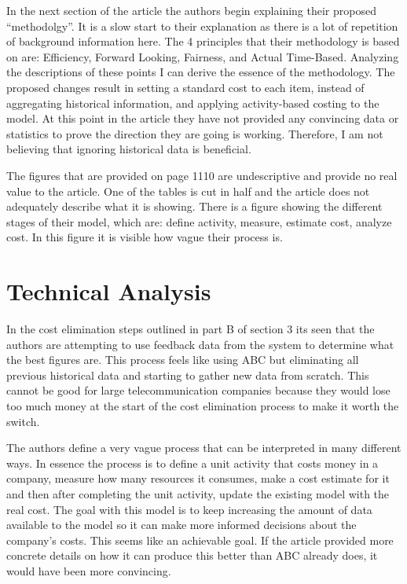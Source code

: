 \documentclass[10pt,]{article}
\begin{document}
In the next section of the article the authors begin explaining their
proposed ``methodolgy''. \citet{thearticle} It is a slow start to their
explanation as there is a lot of repetition of background information
here. The 4 principles that their methodology is based on are:
Efficiency, Forward Looking, Fairness, and Actual Time-Based. Analyzing
the descriptions of these points I can derive the essence of the
methodology. The proposed changes result in setting a standard cost to
each item, instead of aggregating historical information, and applying
activity-based costing to the model. At this point in the article they
have not provided any convincing data or statistics to prove the
direction they are going is working. Therefore, I am not believing that
ignoring historical data is beneficial.

The figures that are provided on page 1110 are undescriptive and provide
no real value to the article. One of the tables is cut in half and the
article does not adequately describe what it is showing. There is a
figure showing the different stages of their model, which are: define
activity, measure, estimate cost, analyze cost. In this figure it is
visible how vague their process is.

\section{Technical Analysis}\label{technical-analysis}

In the cost elimination steps outlined in part B of section 3 its seen
that the authors are attempting to use feedback data from the system to
determine what the best figures are. This process feels like using ABC
but eliminating all previous historical data and starting to gather new
data from scratch. This cannot be good for large telecommunication
companies because they would lose too much money at the start of the
cost elimination process to make it worth the switch.

The authors define a very vague process that can be interpreted in many
different ways. In essence the process is to define a unit activity that
costs money in a company, measure how many resources it consumes, make a
cost estimate for it and then after completing the unit activity, update
the existing model with the real cost. The goal with this model is to
keep increasing the amount of data available to the model so it can make
more informed decisions about the company's costs. This seems like an
achievable goal. If the article provided more concrete details on how it
can produce this better than ABC already does, it would have been more
convincing.
\end{document}
